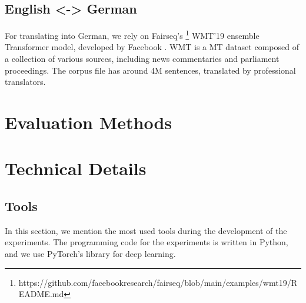 \subsection{English <-> German}
For translating into German, we rely on Fairseq's \footnote{https://github.com/facebookresearch/fairseq/blob/main/examples/wmt19/README.md} WMT’19 ensemble Transformer model, developed by Facebook \parencite{WMT19}. WMT is a MT dataset composed of a collection of various sources, including news commentaries and parliament proceedings. The corpus file has around 4M sentences, translated by professional translators.


\section{Evaluation Methods}
\label{sec:Experiments:Evaluation}



\section{Technical Details}
\label{sec:Experiments:Technical}

\subsection{Tools}
\label{sec:Experiments:Tools}

In this section, we mention the most used tools during the development of the experiments. The programming code for the experiments is written in Python, and we use PyTorch's library for deep learning.

